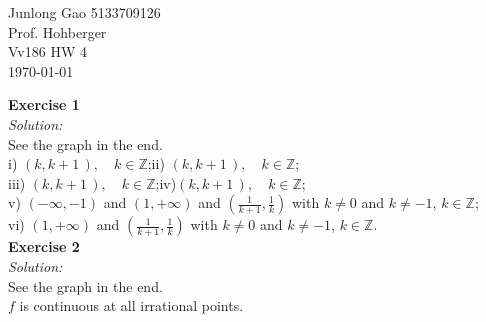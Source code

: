 \documentclass[12pt]{article}
\begin{document}
 
\begin{flushleft}
  Junlong Gao 5133709126\\ 
  Prof.  Hohberger\\ 
  Vv186 HW 4\\
  \today 
\end{flushleft}
{\bf Exercise 1}\\
{\it Solution:}\\
See the graph in the end.\\
i) $(k,k+1\,), \quad k\in\mathbb{Z}$;\qquad ii) $(k,k+1\,), \quad k\in\mathbb{Z}$;\qquad\\
iii) $(k,k+1\,), \quad k\in\mathbb{Z}$;\qquad iv)$(k,k+1\,), \quad k\in\mathbb{Z}$;\qquad\\
v) $(-\infty,-1)$ and $(1,+\infty)$ 
and $(\frac{1}{k+1}, \frac{1}{k})$ with $k\neq0$ and $k\neq-1$, $k\in\mathbb{Z}$;\\
vi)  $(1,+\infty)$ and $(\frac{1}{k+1}, \frac{1}{k})$ with $k\neq0$ and $k\neq-1$, $k\in\mathbb{Z}$.\\

{\bf Exercise 2}\\
{\it Solution:}\\
See the graph in the end.\\
$f$ is continuous at all irrational points.\\
\\
\end{document}
